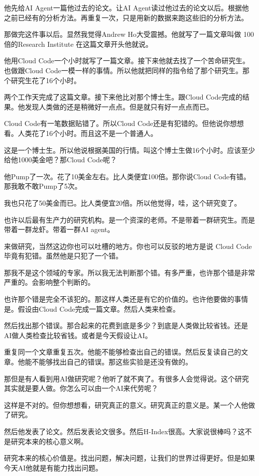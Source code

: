 \documentclass[12pt,a4paper]{article}
\begin{document}
他先给AI Agent一篇他过去的论文。让AI Agent读过他过去的论文以后。根据他之前已经有的分析方法。再重复一次，只是用新的数据来跑这些旧的分析方法。

那做完这件事以后。显然我觉得Andrew Ho大受震撼。他就写了一篇文章叫做 100倍的Research Institute 在这篇文章开头他就说。

他用Cloud Code一个小时就写了一篇文章。接下来他就去找了一个苦命研究生。也做跟Cloud Code一模一样的事情。所以他就把同样的指令给了那个研究生。那个研究生花了16个小时。

两个工作天完成了这篇文章。接下来他比对那个博士生。跟Cloud Code完成的结果。他发现人类做的还是稍微好一点点。但是就只有好一点点而已。

Cloud Code有一笔数据贴错了。所以Cloud Code还是有犯错的。但他说你想想看。人类花了16个小时。而且这不是一个普通人。

这是一个博士生。所以他说根据美国的行情。叫这个博士生做16个小时。应该至少给他1000美金吧？那Cloud Code呢？

他Pump了一次。花了10美金左右。比人类便宜100倍。那你说Cloud Code有错。那我敢不敢Pump了5次。

我也只花了50美金而已。比人类便宜20倍。所以他觉得，哇，这个研究变了。

也许以后最有生产力的研究机构。是一个资深的老师。不是带着一群研究生。而是带着一群龙虾。带着一群AI agent。

来做研究，当然这边你也可以吐槽的地方。你也可以反驳的地方是说 Cloud Code毕竟有犯错。虽然他是只犯了一个错。

那我不是这个领域的专家。所以我无法判断那个错。有多严重，也许那个错是非常严重的。会影响整个判断的。

也许那个错是完全不该犯的。那这样人类还是有它的价值的。也许他要做的事情是。假设由Cloud Code完成一篇文章。然后人类来检查。

然后找出那个错误。那合起来的花费到底是多少？到底是人类做比较省钱。还是AI做人类检查比较省钱。或者是今天假设让AI。

重复同一个文章重复五次。他能不能够检查出自己的错误。然后反复读自己的文章。他能不能够找出自己的错误。那这些实验是还没有做的。

那但是有人看到用AI做研究呢？他听了就不爽了。有很多人会觉得说。这个研究其实就是要人做。你怎么可以由一个AI来代劳呢？

这样是不对的。但你想想看，研究真正的意义。研究真正的意义是。某一个人他做了研究。

然后他发表了论文。然后发表论文很多。然后H-Index很高。大家说很棒吗？这不是研究本来的核心意义啊。

研究本来的核心价值是。找出问题，解决问题，让我们的世界过得更好。但是如果今天AI他就是有能力找出问题。
\end{document}
